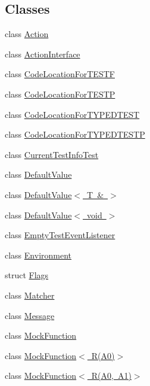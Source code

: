 \subsection*{Classes}
\begin{DoxyCompactItemize}
\item 
class \mbox{\hyperlink{classtesting_1_1_action}{Action}}
\item 
class \mbox{\hyperlink{classtesting_1_1_action_interface}{Action\+Interface}}
\item 
class \mbox{\hyperlink{classtesting_1_1_code_location_for_t_e_s_t_f}{Code\+Location\+For\+T\+E\+S\+TF}}
\item 
class \mbox{\hyperlink{classtesting_1_1_code_location_for_t_e_s_t_p}{Code\+Location\+For\+T\+E\+S\+TP}}
\item 
class \mbox{\hyperlink{classtesting_1_1_code_location_for_t_y_p_e_d_t_e_s_t}{Code\+Location\+For\+T\+Y\+P\+E\+D\+T\+E\+ST}}
\item 
class \mbox{\hyperlink{classtesting_1_1_code_location_for_t_y_p_e_d_t_e_s_t_p}{Code\+Location\+For\+T\+Y\+P\+E\+D\+T\+E\+S\+TP}}
\item 
class \mbox{\hyperlink{classtesting_1_1_current_test_info_test}{Current\+Test\+Info\+Test}}
\item 
class \mbox{\hyperlink{classtesting_1_1_default_value}{Default\+Value}}
\item 
class \mbox{\hyperlink{classtesting_1_1_default_value_3_01_t_01_6_01_4}{Default\+Value$<$ T \& $>$}}
\item 
class \mbox{\hyperlink{classtesting_1_1_default_value_3_01void_01_4}{Default\+Value$<$ void $>$}}
\item 
class \mbox{\hyperlink{classtesting_1_1_empty_test_event_listener}{Empty\+Test\+Event\+Listener}}
\item 
class \mbox{\hyperlink{classtesting_1_1_environment}{Environment}}
\item 
struct \mbox{\hyperlink{structtesting_1_1_flags}{Flags}}
\item 
class \mbox{\hyperlink{classtesting_1_1_matcher}{Matcher}}
\item 
class \mbox{\hyperlink{classtesting_1_1_message}{Message}}
\item 
class \mbox{\hyperlink{classtesting_1_1_mock_function}{Mock\+Function}}
\item 
class \mbox{\hyperlink{classtesting_1_1_mock_function_3_01_r_07_a0_08_4}{Mock\+Function$<$ R(\+A0)$>$}}
\item 
class \mbox{\hyperlink{classtesting_1_1_mock_function_3_01_r_07_a0_00_01_a1_08_4}{Mock\+Function$<$ R(\+A0, A1)$>$}}

\end{DoxyCompactItemize}
